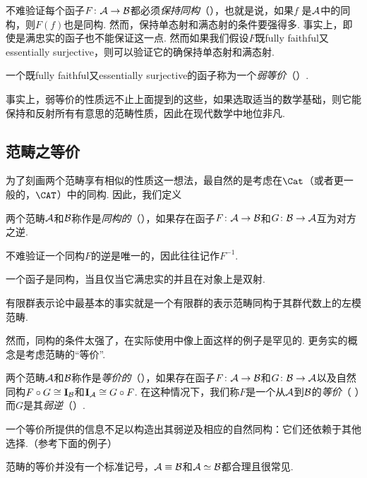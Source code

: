   不难验证每个函子$F\colon{\cal A}\to{\cal B}$都必须\emph{保持同构}（），也就是说，如果$f$ 是${\cal A}$中的同构，则$F(f)$也是同构.
  然而，保持单态射和满态射的条件要强得多. 事实上，即使是满忠实的函子也不能保证这一点.
  然而如果我们假设$F$既fully faithful又essentially surjective，则可以验证它的确保持单态射和满态射.
  \begin{defn}
    一个既fully faithful又essentially surjective的函子称为一个\emph{弱等价}（）.
  \end{defn}

  事实上，弱等价的性质远不止上面提到的这些，如果选取适当的数学基础，则它能保持和反射所有有意思的范畴性质，因此在现代数学中地位非凡.

\subsection{范畴之等价}
  为了刻画两个范畴享有相似的性质这一想法，最自然的是考虑在$\Cat$（或者更一般的，$\CAT$）中的同构. 因此，我们定义
  \begin{defn}
    两个范畴${\cal A}$和${\cal B}$称作是\emph{同构的}（），如果存在函子$F\colon{\cal A}\to{\cal B}$和$G\colon{\cal B}\to{\cal A}$互为对方之逆.
  \end{defn}
  不难验证一个同构$F$的逆是唯一的，因此往往记作$F^{-1}$.

  \begin{prop}
    一个函子是同构，当且仅当它满忠实的并且在对象上是双射.
  \end{prop}

  \begin{exam}
    有限群表示论中最基本的事实就是一个有限群的表示范畴同构于其群代数上的左模范畴.
  \end{exam}

  然而，同构的条件太强了，在实际使用中像上面这样的例子是罕见的.
  更务实的概念是考虑范畴的``等价''.
  \begin{defn}
    两个范畴${\cal A}$和${\cal B}$称作是\emph{等价的}（），如果存在函子$F\colon{\cal A}\to{\cal B}$和$G\colon{\cal B}\to{\cal A}$以及自然同构$F\circ G\cong \operatorname{\mathbf{I}}_{{\cal B}}$和$\operatorname{\mathbf{I}}_{{\cal A}}\cong G\circ F$. 在这种情况下，我们称$F$是一个从${\cal A}$到${\cal B}$的\emph{等价}（
    ）而$G$是其\emph{弱逆}（）.
  \end{defn}
  \begin{rem}
    一个等价所提供的信息不足以构造出其弱逆及相应的自然同构：它们还依赖于其他选择.（参考下面的例子）
  \end{rem}
  \begin{rem}
    范畴的等价并没有一个标准记号，${\cal A}\equiv{\cal B}$和${\cal A}\simeq{\cal B}$都合理且很常见.
  \end{rem}

